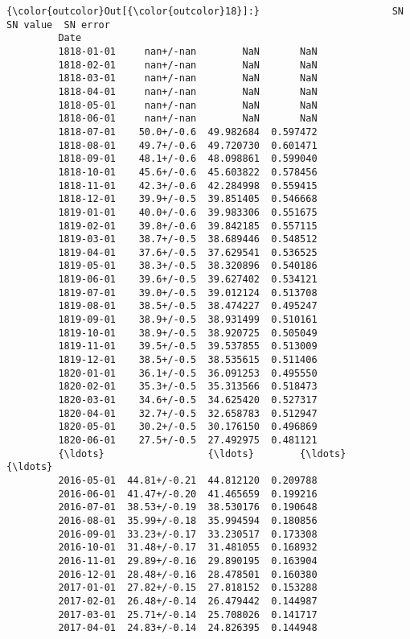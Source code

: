 \documentclass[11pt]{article}
\begin{document}
\begin{Verbatim}[commandchars=\\\{\}]
{\color{outcolor}Out[{\color{outcolor}18}]:}                       SN   SN value  SN error
         Date                                         
         1818-01-01     nan+/-nan        NaN       NaN
         1818-02-01     nan+/-nan        NaN       NaN
         1818-03-01     nan+/-nan        NaN       NaN
         1818-04-01     nan+/-nan        NaN       NaN
         1818-05-01     nan+/-nan        NaN       NaN
         1818-06-01     nan+/-nan        NaN       NaN
         1818-07-01    50.0+/-0.6  49.982684  0.597472
         1818-08-01    49.7+/-0.6  49.720730  0.601471
         1818-09-01    48.1+/-0.6  48.098861  0.599040
         1818-10-01    45.6+/-0.6  45.603822  0.578456
         1818-11-01    42.3+/-0.6  42.284998  0.559415
         1818-12-01    39.9+/-0.5  39.851405  0.546668
         1819-01-01    40.0+/-0.6  39.983306  0.551675
         1819-02-01    39.8+/-0.6  39.842185  0.557115
         1819-03-01    38.7+/-0.5  38.689446  0.548512
         1819-04-01    37.6+/-0.5  37.629541  0.536525
         1819-05-01    38.3+/-0.5  38.320896  0.540186
         1819-06-01    39.6+/-0.5  39.627402  0.534121
         1819-07-01    39.0+/-0.5  39.012124  0.513708
         1819-08-01    38.5+/-0.5  38.474227  0.495247
         1819-09-01    38.9+/-0.5  38.931499  0.510161
         1819-10-01    38.9+/-0.5  38.920725  0.505049
         1819-11-01    39.5+/-0.5  39.537855  0.513009
         1819-12-01    38.5+/-0.5  38.535615  0.511406
         1820-01-01    36.1+/-0.5  36.091253  0.495550
         1820-02-01    35.3+/-0.5  35.313566  0.518473
         1820-03-01    34.6+/-0.5  34.625420  0.527317
         1820-04-01    32.7+/-0.5  32.658783  0.512947
         1820-05-01    30.2+/-0.5  30.176150  0.496869
         1820-06-01    27.5+/-0.5  27.492975  0.481121
         {\ldots}                  {\ldots}        {\ldots}       {\ldots}
         2016-05-01  44.81+/-0.21  44.812120  0.209788
         2016-06-01  41.47+/-0.20  41.465659  0.199216
         2016-07-01  38.53+/-0.19  38.530176  0.190648
         2016-08-01  35.99+/-0.18  35.994594  0.180856
         2016-09-01  33.23+/-0.17  33.230517  0.173308
         2016-10-01  31.48+/-0.17  31.481055  0.168932
         2016-11-01  29.89+/-0.16  29.890195  0.163904
         2016-12-01  28.48+/-0.16  28.478501  0.160380
         2017-01-01  27.82+/-0.15  27.818152  0.153288
         2017-02-01  26.48+/-0.14  26.479442  0.144987
         2017-03-01  25.71+/-0.14  25.708026  0.141717
         2017-04-01  24.83+/-0.14  24.826395  0.144948

\end{Verbatim}
\end{document}
